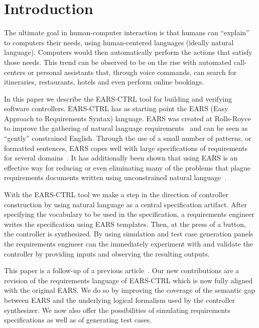 \section{Introduction}
\vspace{-.2cm}The ultimate goal in human-computer interaction is that humans can
``explain'' to computers their needs, using human-centered languages (ideally natural
language). Computers would then automatically perform the actions that
satisfy those needs. This trend can be observed to be on the rise with automated
call-centers or personal assistants that, through voice commands, can
search for itineraries, restaurants, hotels and even perform online bookings.

In this paper we describe the \textsf{EARS-CTRL} tool for building and verifying
software controllers. \textsf{EARS-CTRL} has as starting point the EARS (Easy
Approach to Requirements Syntax) language. EARS was created at Rolls-Royce to
improve the gathering of natural language requirements~\cite{EARS09} and can be
seen as ``gently'' constrained English. Through the use of a small number of
patterns, or formatted sentences, EARS copes well with large  specifications of
requirements for several domains~\cite{EARS10,EARS16}. It has additionally been
shown that using EARS is an effective way for reducing or even eliminating many
of the problems that plague requirements documents written using unconstrained
natural language~\cite{EARS09}.

With the \textsf{EARS-CTRL} tool we make a step in the direction of controller
construction by using natural language as a central specification artifact.
After specifying the vocabulary to be used in the specification, a requirements
engineer writes the specification using EARS templates. Then, at the press of a
button, the controller is synthesized. By using simulation and test case
generation panels the requirements engineer can the immediately experiment with
and validate the controller by providing inputs and observing the resulting
outputs.

This paper is a follow-up of a previous article~\cite{LucioRCM17}.
Our new contributions are a revision of the requirements language of
\textsf{EARS-CTRL} which is now fully aligned with the original EARS. We do so
by improving the coverage of the semantic gap between EARS and the underlying
logical formalism used by the controller synthesizer. We now also offer the
possibilities of simulating requirements specifications as well as of generating test cases.

